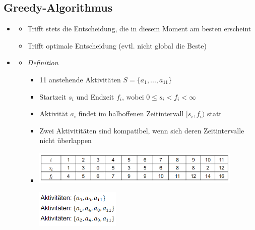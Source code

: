 \documentclass[
    12pt,
    a4paper,
    ngerman,
    color=3b,%
    marginpar=false,
    colorback=false,
    leqno,
]{tudaexercise}
\begin{document}
\subsection{Greedy-Algorithmus}
    \begin{itemize}
        \item {}
            \begin{itemize}
                \item Trifft stets die Entscheidung, die in diesem Moment am besten erscheint
                \item Trifft  optimale Entscheidung (evtl. nicht global die Beste)
            \end{itemize}
        
        \item {}
            \begin{itemize}
                \item \textit{Definition}
                    \begin{itemize}
                        \item 11 anstehende Aktivitäten $S=\{a_1,...,a_{11}\}$
                        \item Startzeit $s_i$ und Endzeit $f_i$, wobei $0 \leq s_i < f_i < \infty$
                        \item Aktivität $a_i$ findet im halboffenen Zeitintervall $[s_i,f_i)$ statt
                        \item Zwei Aktivititäten sind kompatibel, wenn sich deren Zeitintervalle nicht überlappen
                        \item[]
                            \begin{minipage}{0.6\textwidth}
                                \includegraphics[width=10cm]{pictures/aktivProblem1.PNG}
                            \end{minipage}
                            \begin{minipage}{0.3\textwidth}
                                \includegraphics[width=4cm]{pictures/aktivProblem2.PNG}

\end{minipage}
\end{itemize}
\end{itemize}
\end{itemize}
\end{document}
